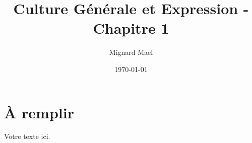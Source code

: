 \documentclass[a4paper,12pt]{article}
\title{Culture Générale et Expression - Chapitre 1}
\author{Mignard Mael}
\date{\today}
\begin{document}
\maketitle

\section{À remplir}

Votre texte ici.
\end{document}
